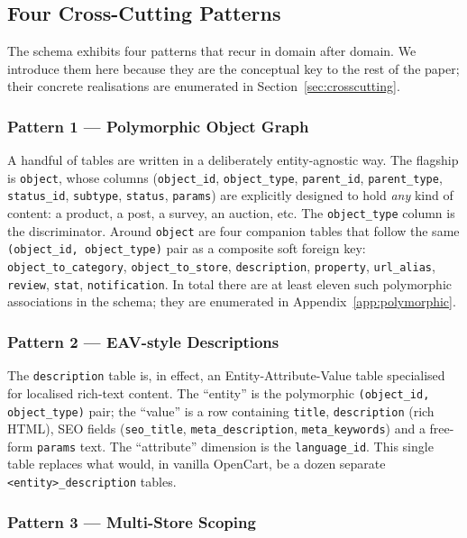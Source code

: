 \documentclass[11pt,a4paper]{article}
\begin{document}
\subsection{Four Cross-Cutting Patterns}

The schema exhibits four patterns that recur in domain after domain.
We introduce them here because they are the conceptual key to the
rest of the paper; their concrete realisations are enumerated in
Section~\ref{sec:crosscutting}.

\subsubsection{Pattern 1 --- Polymorphic Object Graph}

A handful of tables are written in a deliberately entity-agnostic way.
The flagship is \texttt{object}, whose columns (\texttt{object\_id},
\texttt{object\_type}, \texttt{parent\_id}, \texttt{parent\_type},
\texttt{status\_id}, \texttt{subtype}, \texttt{status},
\texttt{params}) are explicitly designed to hold \emph{any} kind of
content: a product, a post, a survey, an auction, etc. The
\texttt{object\_type} column is the discriminator. Around
\texttt{object} are four companion tables that follow the same
\texttt{(object\_id, object\_type)} pair as a composite soft
foreign key: \texttt{object\_to\_category},
\texttt{object\_to\_store}, \texttt{description},
\texttt{property}, \texttt{url\_alias}, \texttt{review},
\texttt{stat}, \texttt{notification}. In total there are at least
eleven such polymorphic associations in the schema; they are
enumerated in Appendix~\ref{app:polymorphic}.

\subsubsection{Pattern 2 --- EAV-style Descriptions}

The \texttt{description} table is, in effect, an
Entity-Attribute-Value table specialised for localised rich-text
content. The ``entity'' is the polymorphic \texttt{(object\_id,
object\_type)} pair; the ``value'' is a row containing
\texttt{title}, \texttt{description} (rich HTML), SEO fields
(\texttt{seo\_title}, \texttt{meta\_description},
\texttt{meta\_keywords}) and a free-form \texttt{params} text.
The ``attribute'' dimension is the \texttt{language\_id}. This
single table replaces what would, in vanilla OpenCart, be a dozen
separate \texttt{<entity>\_description} tables.

\subsubsection{Pattern 3 --- Multi-Store Scoping}
\end{document}
